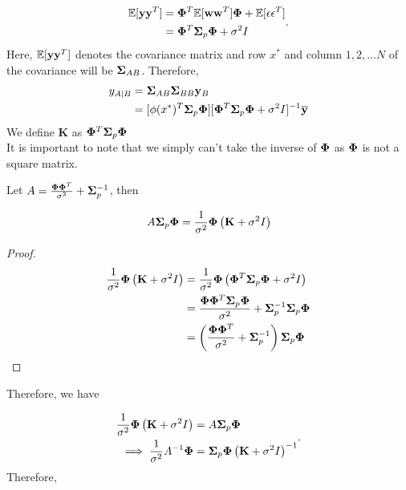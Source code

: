 \documentclass[12pt]{article}
\begin{document}
\[
	\begin{split}
		\mathbb{E} [\bold{y y}^T] &=   \bold{\Phi}^T \mathbb{E}[\bold{w w}^T] \bold{\Phi} + \mathbb{E}[\epsilon \epsilon^T] \\
		&= \bold{\Phi}^T \bold{\Sigma}_p \bold{\Phi} + \sigma^2 I \\
	\end{split}
	.\]
\noindent Here, $\mathbb{E}[\bold{y y}^T]$ denotes the covariance matrix and row $x^*$ and column $1, 2, \ldots N$ of the covariance will be $\bold{\Sigma}_{AB}$. Therefore, 
\[
\begin{split}
	y_{A\mid B} &= \bold{\Sigma}_{AB} \bold{\Sigma}_{BB} \bold{y}_B \\
		    &=  [\phi(x^*)^T \bold{\Sigma}_p \bold{\Phi}][\bold{\Phi}^T \bold{\Sigma}_p \bold{\Phi} + \sigma^2 I]^{-1} \bold{\overline y} \\
\end{split}
\]
\noindent We define $ \textbf{K}$ as $\bold{\Phi}^T \bold{\Sigma}_p \bold{\Phi}$\\

\noindent It is important to note that we simply can't take the inverse of $\bold{\Phi}$ as $\bold{\Phi}$ is not a square matrix.
\begin{theorem}
    Let $A = \frac{\bold{\Phi}\bold{\Phi}^T}{\sigma^2}+\bold{\Sigma}_p^{-1}$, then
    
 	\[
 	A \bold{\Sigma}_p \bold{\Phi} = \frac{1}{\sigma^2}\bold{\Phi}\left( \textbf{K} + \sigma^2 I \right) 
 	\]
\end{theorem}

\begin{proof}
	\[
	\begin{split}
		\frac{1}{\sigma^2}\bold{\Phi}\left(  \textbf{K} + \sigma^2 I \right)&= \frac{1}{\sigma^2}\bold{\Phi}\left( \bold{\Phi}^T \bold{\Sigma}_p \bold{\Phi} + \sigma^2 I \right) \\								   &= \frac{\bold{\Phi} \bold{\Phi}^T \bold{\Sigma}_p \bold{\Phi}}{\sigma^2} + \bold{\Sigma}_p^{-1} \bold{\Sigma}_p \bold{\Phi} \\
										   &= \left( \frac{\bold{\Phi} \bold{\Phi}^T}{\sigma^2} + \bold{\Sigma}_p^{-1} \right)\bold{\Sigma}_p \bold{\Phi}  \\
	\end{split}
		\]
\end{proof}

\noindent Therefore, we have

\[
	\begin{split}
		\frac{1}{\sigma^2}\bold{\Phi}\left(  \textbf{K} + \sigma^2 I \right) &= A \bold{\Sigma}_p \bold{\Phi} \\
		\implies \frac{1}{\sigma^2}A^{-1} \bold{\Phi} &= \bold{\Sigma}_p \bold{\Phi} \left( \bold{K} + \sigma^2 I \right)^{-1} \\
	\end{split}
.\]
Therefore, 
\end{document}
